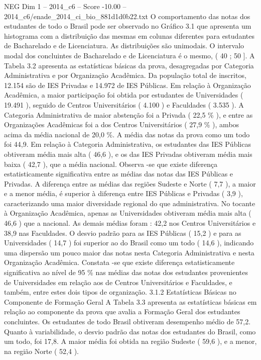 \begin{textsample}{NEG Dim 1 – 2014\_c6 – Score -10.00 – 2014\_c6/enade\_2014\_ci\_bio\_881d1d0b22.txt}
O comportamento das notas dos estudantes de todo o Brasil pode ser observado no Gráfico 3.1 que apresenta um histograma com a distribuição das mesmas em colunas diferentes para estudantes de Bacharelado e de Licenciatura.
As distribuições são unimodais.
O intervalo modal dos concluintes de Bacharelado e de Licenciatura é o mesmo, ( 40 ; 50 ].
A Tabela 3.2 apresenta as estatísticas básicas da prova, desagregadas por Categoria Administrativa e por Organização Acadêmica.
Da população total de inscritos, 12.154 são de IES Privadas e 14.972 de IES Públicas.
Em relação à Organização Acadêmica, a maior participação foi obtida por estudantes de Universidades ( 19.491 ), seguido de Centros Universitários ( 4.100 ) e Faculdades ( 3.535 ).
A Categoria Administrativa de maior abstenção foi a Privada ( 22,5 \% ), e entre as Organizações Acadêmicas foi a dos Centros Universitários ( 27,9 \% ), ambos acima da média nacional de 20,0 \%.
A média das notas da prova como um todo foi 44,9.
Em relação à Categoria Administrativa, os estudantes das IES Públicas obtiveram média mais alta ( 46,6 ), e os das IES Privadas obtiveram média mais baixa ( 42,7 ), que a média nacional.
Observa -se que existe diferença estatisticamente significativa entre as médias das notas das IES Públicas e Privadas.
A diferença entre as médias das regiões Sudeste e Norte ( 7,7 ), a maior e a menor média, é superior à diferença entre IES Públicas e Privadas ( 3,9 ), caracterizando uma maior diversidade regional do que administrativa.
No tocante à Organização Acadêmica, apenas as Universidades obtiveram média mais alta ( 46,6 ) que a nacional.
As demais médias foram : 42,2 nos Centros Universitários e 38,9 nas Faculdades.
O desvio padrão para as IES Públicas ( 15,2 ) e para as Universidades ( 14,7 ) foi superior ao do Brasil como um todo ( 14,6 ), indicando uma dispersão um pouco maior das notas nesta Categoria Administrativa e nesta Organização Acadêmica.
Constata -se que existe diferença estatisticamente significativa ao nível de 95 \% nas médias das notas dos estudantes provenientes de Universidades em relação aos de Centros Universitários e Faculdades, e também, entre estes dois tipos de organização. 3.1.2 Estatísticas Básicas no Componente de Formação Geral A Tabela 3.3 apresenta as estatísticas básicas em relação ao componente da prova que avalia a Formação Geral dos estudantes concluintes.
Os estudantes de todo Brasil obtiveram desempenho médio de 57,2.
Quanto à variabilidade, o desvio padrão das notas dos estudantes do Brasil, como um todo, foi 17,8.
A maior média foi obtida na região Sudeste ( 59,6 ), e a menor, na região Norte ( 52,4 ).

\end{textsample}
